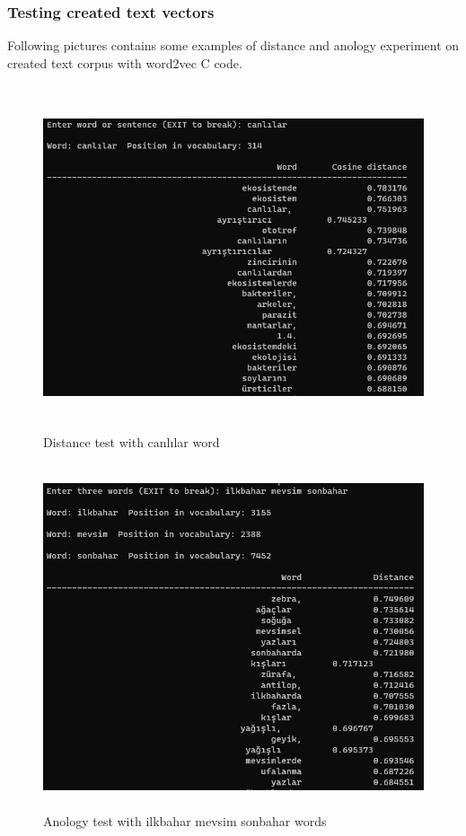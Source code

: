 \documentclass{article}
\begin{document}
\subsubsection{Testing created text vectors}
Following pictures contains some examples of distance and anology experiment on created text corpus with word2vec C code.
\begin{figure}[H]
    \centering
	\includegraphics[width=6in, height=4in]{8.JPG}
	\caption[Optional caption]{Distance test with canlılar word}
	\label{}
\end{figure}
\begin{figure}[H]
    \centering
	\includegraphics[width=6in, height=4in]{11.JPG}
	\caption[Optional caption]{Anology test with ilkbahar mevsim sonbahar words}
	\label{}
\end{figure}
\end{document}
